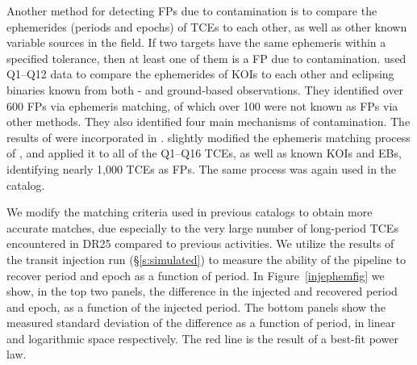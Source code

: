 Another method for detecting FPs due to contamination is to compare the ephemerides (periods and epochs) of TCEs to each other, as well as other known variable sources in the \kepler{} field. If two targets have the same ephemeris within a specified tolerance, then at least one of them is a FP due to contamination. \citet{Coughlin2014a} used Q1--Q12 data to compare the ephemerides of KOIs to each other and eclipsing binaries known from both \kepler{}- and ground-based observations. They identified over 600 FPs via ephemeris matching, of which over 100 were not known as FPs via other methods. They also identified four main mechanisms of contamination. The results of \citet{Coughlin2014a} were incorporated in \citet[][see \S3.3]{Rowe2015a}. \citet[][see \S5.3]{Mullally2015cat} slightly modified the ephemeris matching process of \citet{Coughlin2014a}, and applied it to all of the Q1--Q16 TCEs, as well as known KOIs and EBs, identifying nearly 1,000 TCEs as FPs. The same process was again used in the \citet{Coughlin2016} catalog.

We modify the matching criteria used in previous catalogs to obtain more accurate matches, due especially to the very large number of long-period TCEs encountered in DR25 compared to previous activities. We utilize the results of the transit injection run (\S\ref{s:simulated}) to measure the ability of the \kepler{} pipeline to recover period and epoch as a function of period. In Figure~\ref{injephemfig} we show, in the top two panels, the difference in the injected and recovered period and epoch, as a function of the injected period. The bottom panels show the measured standard deviation of the difference as a function of period, in linear and logarithmic space respectively. The red line is the result of a best-fit power law.

